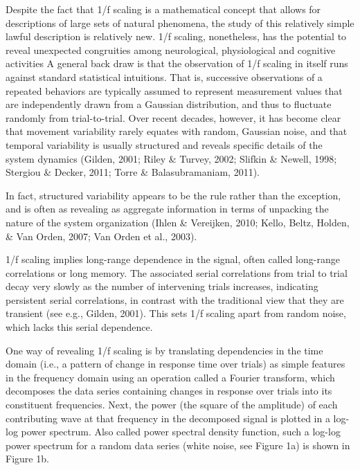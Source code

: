 \documentclass[12pt,]{book}
\begin{document}
Despite the fact that 1/f scaling is a mathematical concept that allows for descriptions of large sets of natural phenomena, the study of this relatively simple lawful description is relatively new. 1/f scaling, nonetheless, has the potential to reveal unexpected congruities among neurological, physiological and cognitive activities A general back draw is that the observation of 1/f scaling in itself runs against standard statistical intuitions. That is, successive observations of a repeated behaviors are typically assumed to represent measurement values that are independently drawn from a Gaussian distribution, and thus to fluctuate randomly from trial-to-trial. Over recent decades, however, it has become clear that movement variability rarely equates with random, Gaussian noise, and that temporal variability is usually structured and reveals specific details of the system dynamics (Gilden, 2001; Riley \& Turvey, 2002; Slifkin \& Newell, 1998; Stergiou \& Decker, 2011; Torre \& Balasubramaniam, 2011).

In fact, structured variability appears to be the rule rather than the exception, and is often as revealing as aggregate information in terms of unpacking the nature of the system organization (Ihlen \& Vereijken, 2010; Kello, Beltz, Holden, \& Van Orden, 2007; Van Orden et al., 2003).

1/f scaling implies long-range dependence in the signal, often called long-range correlations or long memory. The associated serial correlations from trial to trial decay very slowly as the number of intervening trials increases, indicating persistent serial correlations, in contrast with the traditional view that they are transient (see e.g., Gilden, 2001). This sets 1/f scaling apart from random noise, which lacks this serial dependence.

One way of revealing 1/f scaling is by translating dependencies in the time domain (i.e., a pattern of change in response time over trials) as simple features in the frequency domain using an operation called a Fourier transform, which decomposes the data series containing changes in response over trials into its constituent frequencies. Next, the power (the square of the amplitude) of each contributing wave at that frequency in the decomposed signal is plotted in a log-log power spectrum. Also called power spectral density function, such a log-log power spectrum for a random data series (white noise, see Figure 1a) is shown in Figure 1b.
\end{document}
